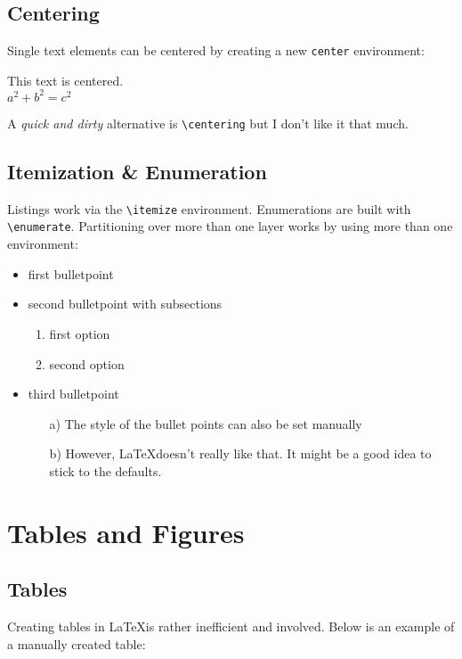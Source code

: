 \documentclass[a4paper]{scrartcl}
\begin{document}
	\subsection{Centering}
	Single text elements can be centered by creating a new \texttt{center} environment:
	
	\begin{center}
		This text is centered.\\
		$ a^2 + b^2 = c^2$
	\end{center}

A \emph{quick and dirty} alternative is \texttt{\textbackslash centering} but I don't like it that much.
	
	\subsection{Itemization \& Enumeration}
	Listings work via the \texttt{\textbackslash itemize} environment. Enumerations are built with \texttt{\textbackslash enumerate}. Partitioning over more than one layer works by using more than one environment:
	
	\begin{itemize}
		\item first bulletpoint
		\item second bulletpoint with subsections
		\begin{enumerate}
			\item first option
			\item second option
		\end{enumerate}
		\item third bulletpoint
			\begin{itemize}
				\item [a)]  The style of the bullet points can also be set manually
				\item [b)] However, \LaTeX \space doesn't really like that. It might be a good idea to stick to the defaults.
			\end{itemize}
	\end{itemize}

	
	\newpage
	
	\section{Tables and Figures}
	
	\subsection{Tables}
		Creating tables in \LaTeX is rather inefficient and involved. Below is an example of a manually created table:\\
		
\end{document}
